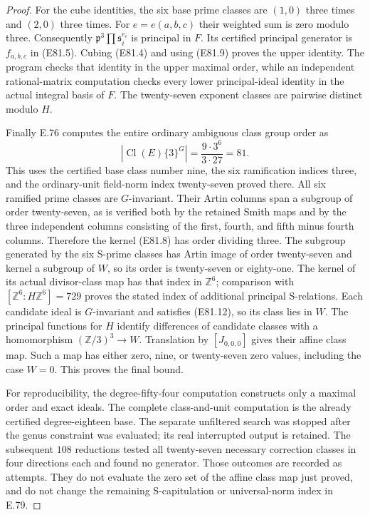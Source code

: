 \begin{proof}
For the cube identities, the six base prime classes
are $(1,0)$ three times and $(2,0)$ three times.
For $e=e(a,b,c)$ their weighted sum is zero modulo
three. Consequently
$\mathfrak p^3\prod\mathfrak s_i^{e_i}$ is principal
in $F$. Its certified principal generator is
$f_{a,b,c}$ in (E81.5). Cubing (E81.4) and using
(E81.9) proves the upper identity. The program
checks that identity in the upper maximal order,
while an independent rational-matrix computation
checks every lower principal-ideal identity in the
actual integral basis of $F$. The twenty-seven
exponent classes are pairwise distinct modulo $H$.

Finally E.76 computes the entire ordinary ambiguous
class group order as
\[
 |\operatorname{Cl}(E)\{3\}^{G}|
       =\frac{9\cdot3^6}{3\cdot27}=81.
 \tag{E81.14}
\]
This uses the certified base class number nine, the
six ramification indices three, and the ordinary-unit
field-norm index twenty-seven proved there. All six
ramified prime classes are $G$-invariant. Their
Artin columns span a subgroup of order twenty-seven,
as is verified both by the retained Smith maps and
by the three independent columns consisting of the
first, fourth, and fifth minus fourth columns.
Therefore the kernel (E81.8) has order dividing
three. The subgroup generated by the six S-prime
classes has Artin image of order twenty-seven and
kernel a subgroup of $W$, so its order is twenty-seven
or eighty-one. The kernel of its actual divisor-class
map has that index in $\mathbb Z^6$; comparison with
$[\mathbb Z^6:H\mathbb Z^6]=729$ proves the stated
index of additional principal S-relations.
Each candidate ideal is $G$-invariant and
satisfies (E81.12), so its class lies in $W$.
The principal functions for $H$ identify differences
of candidate classes with a homomorphism
$(\mathbb Z/3)^3\to W$. Translation by $[J_{0,0,0}]$
gives their affine class map. Such a map has either
zero, nine, or twenty-seven zero values, including
the case $W=0$. This proves the final bound.

For reproducibility, the degree-fifty-four computation
constructs only a maximal order and exact ideals.
The complete class-and-unit computation is the
already certified degree-eighteen base. The separate
unfiltered search was stopped after the genus
constraint was evaluated; its real interrupted
output is retained. The subsequent $108$ reductions
tested all twenty-seven necessary correction classes
in four directions each and found no generator.
Those outcomes are recorded as attempts. They do
not evaluate the zero set of the affine class map
just proved, and do not change the remaining
S-capitulation or universal-norm index in E.79.
\end{proof}

